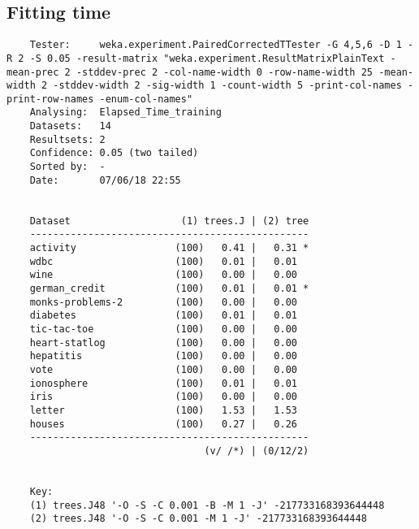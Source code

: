 \subsection{Fitting time}
\begin{verbatim}
    Tester:     weka.experiment.PairedCorrectedTTester -G 4,5,6 -D 1 -R 2 -S 0.05 -result-matrix "weka.experiment.ResultMatrixPlainText -mean-prec 2 -stddev-prec 2 -col-name-width 0 -row-name-width 25 -mean-width 2 -stddev-width 2 -sig-width 1 -count-width 5 -print-col-names -print-row-names -enum-col-names"
    Analysing:  Elapsed_Time_training
    Datasets:   14
    Resultsets: 2
    Confidence: 0.05 (two tailed)
    Sorted by:  -
    Date:       07/06/18 22:55
    
    
    Dataset                   (1) trees.J | (2) tree
    ------------------------------------------------
    activity                 (100)   0.41 |   0.31 *
    wdbc                     (100)   0.01 |   0.01  
    wine                     (100)   0.00 |   0.00  
    german_credit            (100)   0.01 |   0.01 *
    monks-problems-2         (100)   0.00 |   0.00  
    diabetes                 (100)   0.01 |   0.01  
    tic-tac-toe              (100)   0.00 |   0.00  
    heart-statlog            (100)   0.00 |   0.00  
    hepatitis                (100)   0.00 |   0.00  
    vote                     (100)   0.00 |   0.00  
    ionosphere               (100)   0.01 |   0.01  
    iris                     (100)   0.00 |   0.00  
    letter                   (100)   1.53 |   1.53  
    houses                   (100)   0.27 |   0.26  
    ------------------------------------------------
                                  (v/ /*) | (0/12/2)
    
    
    Key:
    (1) trees.J48 '-O -S -C 0.001 -B -M 1 -J' -217733168393644448
    (2) trees.J48 '-O -S -C 0.001 -M 1 -J' -217733168393644448    
\end{verbatim}

